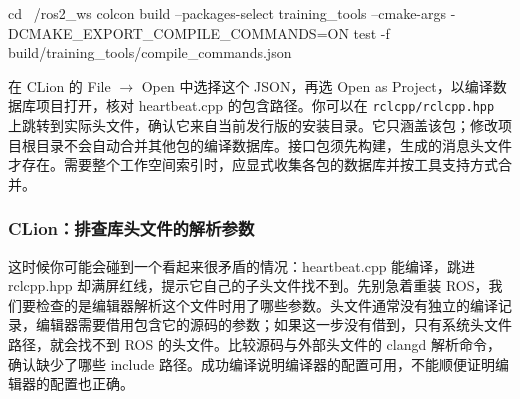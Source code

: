 \begin{example}[生成并核对索引来源]
\par\medskip\noindent\begin{minipage}{\linewidth}
\begin{tbash}
cd ~/ros2_ws
colcon build --packages-select training_tools --cmake-args -DCMAKE_EXPORT_COMPILE_COMMANDS=ON
test -f build/training_tools/compile_commands.json
\end{tbash}
\end{minipage}\par\smallskip
在 CLion 的 File $\rightarrow$ Open 中选择这个 JSON，再选 Open as Project，以编译数据库项目打开，核对 heartbeat.cpp 的包含路径。你可以在 \texttt{rclcpp/rclcpp.hpp} 上跳转到实际头文件，确认它来自当前发行版的安装目录。它只涵盖该包；修改项目根目录不会自动合并其他包的编译数据库。接口包须先构建，生成的消息头文件才存在。需要整个工作空间索引时，应显式收集各包的数据库并按工具支持方式合并。
\end{example}

\subsubsection{CLion：排查库头文件的解析参数}
这时候你可能会碰到一个看起来很矛盾的情况：heartbeat.cpp 能编译，跳进 rclcpp.hpp 却满屏红线，提示它自己的子头文件找不到。先别急着重装 ROS，我们要检查的是编辑器解析这个文件时用了哪些参数。头文件通常没有独立的编译记录，编辑器需要借用包含它的源码的参数；如果这一步没有借到，只有系统头文件路径，就会找不到 ROS 的头文件。比较源码与外部头文件的 clangd 解析命令，确认缺少了哪些 include 路径。成功编译说明编译器的配置可用，不能顺便证明编辑器的配置也正确。

